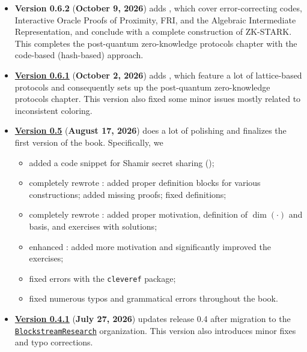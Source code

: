 \begin{itemize}
    \item \textbf{Version 0.6.2} (\textbf{October 9, 2026}) adds , which cover error-correcting codes, Interactive Oracle Proofs of Proximity, FRI, and the Algebraic Intermediate Representation, and conclude with a complete construction of ZK-STARK.
    This completes the post-quantum zero-knowledge protocols chapter with the code-based (hash-based) approach.
    \item \href{https://github.com/BlockstreamResearch/zk-book/releases/tag/v0.6.1}{\textbf{Version 0.6.1}} (\textbf{October 2, 2026}) adds , which feature a lot of lattice-based protocols and consequently sets up the post-quantum zero-knowledge protocols chapter.
    This version also fixed some minor issues mostly related to inconsistent coloring.
    \item \href{https://github.com/BlockstreamResearch/zk-book/releases/tag/v0.5}{\textbf{Version 0.5}} (\textbf{August 17, 2026}) does a lot of polishing and finalizes the first version of the book.
    Specifically, we
    \begin{itemize}
        \item added a code snippet for Shamir secret sharing ();
        \item completely rewrote : added proper definition blocks for various constructions; added missing proofs; fixed definitions;
        \item completely rewrote : added proper motivation, definition of $\dim(\cdot)$ and basis, and exercises with solutions;
        \item enhanced : added more motivation and significantly improved the exercises;
        \item fixed errors with the \texttt{cleveref} package;
        \item fixed numerous typos and grammatical errors throughout the book.
    \end{itemize}
    \item \href{https://github.com/BlockstreamResearch/zk-book/releases/tag/v0.4.1}{\textbf{Version 0.4.1}} (\textbf{July 27, 2026}) updates release 0.4 after migration to the \href{https://github.com/BlockstreamResearch}{\texttt{BlockstreamResearch}} organization.
    This version also introduces minor fixes and typo corrections.

\end{itemize}

